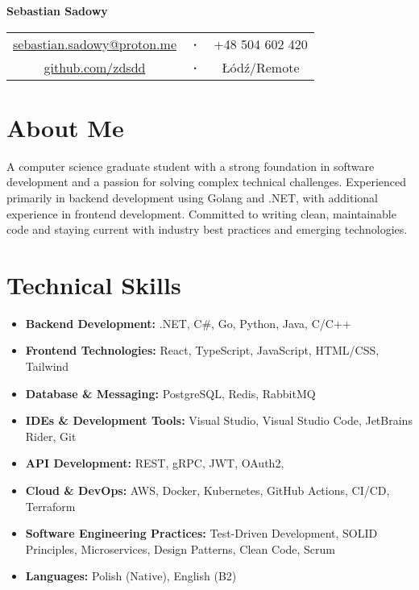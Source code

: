 \documentclass[a4paper,10pt]{article}
\begin{document}
\begin{center}
    {\Huge\textbf{Sebastian Sadowy}} \\[0.3cm]
    \begin{tabular}{c c c}
        \href{mailto:sebastian.sadowy@proton.me}{sebastian.sadowy@proton.me} & 
        \textbf{·} & 
        +48 504 602 420 \\
        \href{https://github.com/zdsdd}{github.com/zdsdd} &
        \textbf{·} &
        Łódź/Remote
    \end{tabular}
\end{center}

\section{About Me}
A computer science graduate student with a strong foundation in software development and a passion for solving complex technical challenges. Experienced primarily in backend development using Golang and .NET, with additional experience in frontend development. Committed to writing clean, maintainable code and staying current with industry best practices and emerging technologies.

\section{Technical Skills}
\begin{itemize}[leftmargin=0.5cm, itemsep=4pt]
    \item \textbf{Backend Development:} .NET, C\#, Go, Python, Java, C/C++
    \item \textbf{Frontend Technologies:} React, TypeScript, JavaScript, HTML/CSS, Tailwind
    \item \textbf{Database \& Messaging:} PostgreSQL, Redis, RabbitMQ
    \item \textbf{IDEs \& Development Tools:} Visual Studio, Visual Studio Code, JetBrains Rider, Git
    \item \textbf{API Development:} REST, gRPC, JWT, OAuth2,
    \item \textbf{Cloud \& DevOps:} AWS, Docker, Kubernetes, GitHub Actions, CI/CD, Terraform
    \item \textbf{Software Engineering Practices:} Test-Driven Development, SOLID Principles, Microservices, Design Patterns, Clean Code, Scrum
    \item \textbf{Languages:} Polish (Native), English (B2)
\end{itemize}
\end{document}
